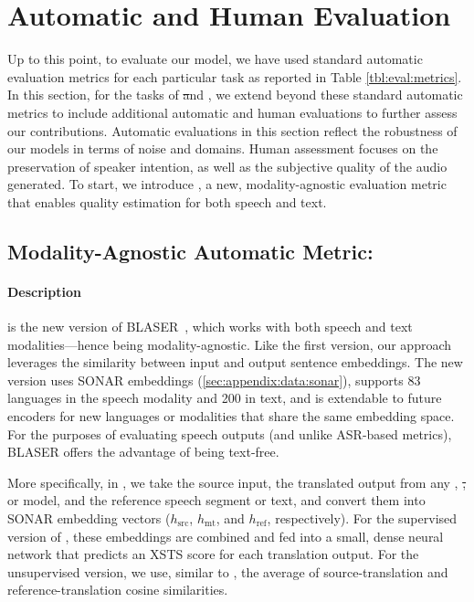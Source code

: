 \section{Automatic and Human Evaluation}
\label{sec:appendix:evaluation}


Up to this point, to evaluate our model, we have used standard automatic evaluation metrics for each particular task as reported in Table \ref{tbl:eval:metrics}. In this section, for the tasks of \st and \sst, we extend beyond these standard automatic metrics to include additional automatic and human evaluations to further assess our contributions. Automatic evaluations in this section reflect the robustness of our models in terms of noise and domains. Human assessment focuses on the preservation of speaker intention, as well as the subjective quality of the audio generated. To start, we introduce \blaser, a new, modality-agnostic evaluation metric that enables quality estimation for both speech and text.


\subsection{Modality-Agnostic Automatic Metric: \blaser} 
\label{sec:eval:blaser}

\paragraph{Description} \blaser is the new version of BLASER~\citep{chen-etal-2023-blaser}, which works with both speech and text modalities—hence being modality-agnostic. Like the first version, our approach leverages the similarity between input and output sentence embeddings. The new version uses SONAR embeddings (\ref{sec:appendix:data:sonar}), supports 83 languages in the speech modality and 200 in text, and is extendable to future encoders for new languages or modalities that share the same embedding space.
For the purposes of evaluating speech outputs (and unlike ASR-based metrics), BLASER offers the advantage of being text-free. 

More specifically, in \blaser, we take the source input, the translated output from any \sst, \st, or \mt model, and the reference speech segment or text, and convert them into SONAR embedding vectors ($h_\text{src}$, $h_\text{mt}$, and $h_\text{ref}$, respectively). For the supervised version of \blaser, these embeddings are combined and fed into a small, dense neural network that predicts an XSTS score for each translation output. For the unsupervised version, we use, similar to \cite{chen-etal-2023-blaser}, the average of source-translation and reference-translation cosine similarities.

